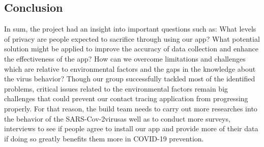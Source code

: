   \subsection{Conclusion}
    \par In sum, the project had an insight into important questions such as: What levels of privacy are people expected to sacrifice through using our app? What potential solution might be applied to improve the accuracy of data collection and enhance the effectiveness of the app?  How can we overcome limitations and challenges which are relative to environmental factors and the gaps in the knowledge about the virus behavior? Though our group successfully tackled most of the identified problems,  critical issues related to the environmental factors remain big  challenges that could prevent our contact tracing application from progressing properly. For that reason, the build team needs to carry out more researches into the behavior of the SARS-Cov-2virusas  well as to conduct more surveys, interviews to see if people agree to install our app and provide more of their data if doing so greatly benefits them more in COVID-19 prevention.


